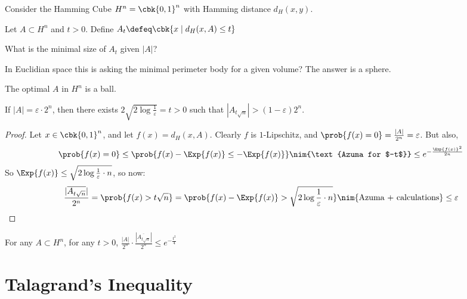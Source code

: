\documentclass[a4paper, 11pt, oneside]{book}
\begin{document}
\begin{example}
	Consider the Hamming Cube $H^n = \cbk{0,1}^n$ with Hamming distance $d_H(x,y)$.
	\begin{defn}
		Let $A\subset H^n$ and $t>0$. Define $A_t \defeq \cbk{x\mid d_H(x,A)\le t}$
	\end{defn}
	\begin{question}
	 What is the minimal size of $A_t$ given $|A|$?
	\end{question}
	In Euclidian space this is asking the minimal perimeter body for a given volume? The answer is a sphere.
	\begin{thm}
		[Harper]\label{thm: Isoperimetric Harper} The optimal $A$ in $H^n$ is a ball.
	\end{thm}
	\begin{thm}
		If $|A| = \varepsilon \cdot 2^n$, then there exists $2\sqrt{2\log \frac{1}{\varepsilon}} = t>0$ such that $|A_{t\sqrt{n}}|>(1-\varepsilon)2^n$.
	\end{thm}
	\begin{proof}
		Let $x\in \cbk{0,1}^n$, and let $f(x) = d_H(x,A)$. Clearly $f$ is $1$-Lipschitz, and $\prob{f(x) =0} = \frac{|A|}{2^n} = \varepsilon$. But also,
		\begin{align*}
			\prob{f(x) = 0}\le \prob{f(x) - \Exp{f(x)}\le -\Exp{f(x)}}\nim{\text{Azuma for $-t$}}\le e^{-\frac{\Exp{f(x)}^2}{2n}}
		\end{align*}
		So $\Exp{f(x)}\le \sqrt{2\log\frac{1	}{\varepsilon}\cdot n}$, so now:
		\begin{align*}
			\frac{|\overline{A_{t\sqrt{n}}}|}{2^n} = \prob{f(x) > t\sqrt{n}} =\prob{f(x) - \Exp{f(x)} > \sqrt{2\log\frac{1	}{\varepsilon}\cdot n}}\nim{\text{Azuma + calculations}}\le \varepsilon
		\end{align*}
	\end{proof}
	\begin{thm}
		For any $A\subset H^n$, for any $t>0$, $\frac{|A|}{2^n}\cdot\frac{|\overline{A_{t\sqrt{n}}}|}{2^n}\le e^{-\frac{t^2}{4}}$
	\end{thm}
\end{example}
\section{Talagrand's Inequality}
\end{document}
